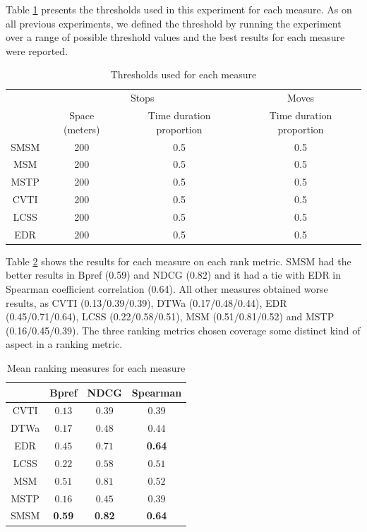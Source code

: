 \documentclass[12pt]{article}
\begin{document}
Table \ref{tab:involves_thresholds} presents the thresholds used in this experiment for each measure. As on all previous experiments, we defined the threshold by running the experiment over a range of possible threshold values and the best results for each measure were reported.

\begin{table}[!h]
\scriptsize
  \centering
  \begin{tabular}{|c|c|c|c|}
  	\hline
  & \multicolumn{2}{c|}{Stops} & \multicolumn{1}{c|}{Moves} \\
 	\cline{2-4}
  & Space (meters) & Time duration proportion & Time duration proportion \\
  	\hline
 SMSM & 200 & 0.5 & 0.5 \\
 MSM & 200 & 0.5 & 0.5 \\
 MSTP & 200 & 0.5 & 0.5 \\
 CVTI & 200 & 0.5 & 0.5 \\
 LCSS & 200 & 0.5 & 0.5 \\
 EDR & 200 & 0.5 & 0.5 \\
    \hline
  \end{tabular}
  \caption{Thresholds used for each measure}
  \label{tab:involves_thresholds}
\end{table}

Table \ref{tab:involves_measures_ranking} shows the results for each measure on each rank metric. SMSM had the better results in Bpref (0.59) and NDCG (0.82) and it had a tie with EDR in Spearman coefficient correlation (0.64). All other measures obtained worse results, as CVTI (0.13/0.39/0.39), DTWa (0.17/0.48/0.44), EDR (0.45/0.71/0.64), LCSS (0.22/0.58/0.51), MSM (0.51/0.81/0.52) and MSTP (0.16/0.45/0.39). The three ranking metrics chosen coverage some distinct kind of aspect in a ranking metric. 

\begin{table}[ht!]
\footnotesize
  \centering
  \begin{tabular}{|c|c|c|c|}
  	\hline
  & Bpref & NDCG & Spearman \\
  	\hline
CVTI & $0.13$ & $0.39$& $0.39$ \\
DTWa & $0.17$ & $0.48$& $0.44$ \\
EDR  & $0.45$ & $0.71$& \textbf{0.64} \\
LCSS & $0.22$ & $0.58$& $0.51$ \\
MSM  & $0.51$ & $0.81$& $0.52$ \\
MSTP & $0.16$ & $0.45$& $0.39$ \\
SMSM & \textbf{0.59} & \textbf{0.82}& \textbf{0.64}  \\
    \hline
  \end{tabular}
  \caption{Mean ranking measures for each measure}
  \label{tab:involves_measures_ranking}
\end{table}
\end{document}
